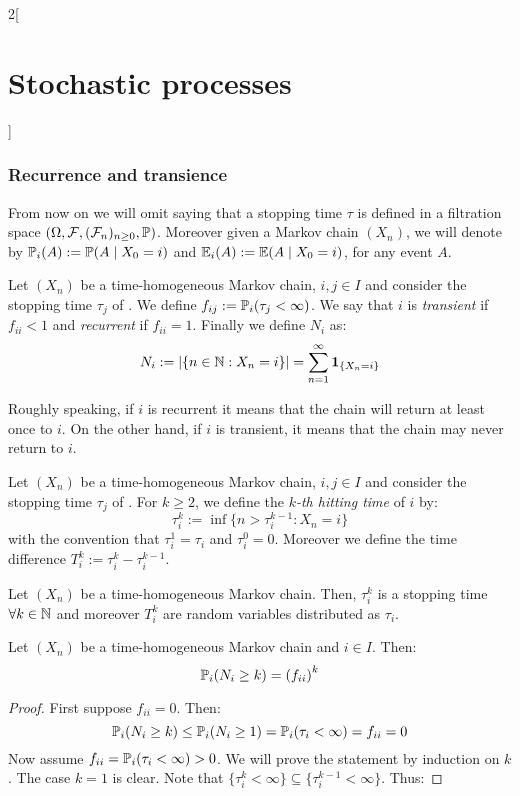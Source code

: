 \documentclass[../../../main_math.tex]{subfiles}
\begin{document}
\begin{multicols}{2}[\section{Stochastic processes}]
  \subsubsection{Recurrence and transience}
  From now on we will omit saying that a stopping time $\tau$ is defined in a filtration space $(\Omega,\mathcal{F},(\mathcal{F}_n)_{n\geq 0},\mathbb{P})$. Moreover given a Markov chain $(X_n)$, we will denote by $\mathbb{P}_i(A):=\mathbb{P}(A\mid X_0=i)$ and $\mathbb{E}_i(A):=\mathbb{E}(A\mid X_0=i)$, for any event $A$.
  \begin{definition}
    Let $(X_n)$ be a time-homogeneous Markov chain, $i,j\in I$ and consider the stopping time $\tau_j$ of . We define $f_{ij}:=\mathbb{P}_i(\tau_j<\infty)$. We say that $i$ is \emph{transient} if $f_{ii}<1$ and \emph{recurrent} if $f_{ii}=1$. Finally we define $N_i$ as:
    $$
      N_i:=\abs{\{n\in\mathbb{N}:X_n=i\}}=\sum_{n=1}^{\infty}\boldsymbol{\mathrm{1}}_{\{X_n=i\}}
    $$
  \end{definition}
  \begin{remark}
    Roughly speaking, if $i$ is recurrent it means that the chain will return at least once to $i$. On the other hand, if $i$ is transient, it means that the chain may never return to $i$.
  \end{remark}
  \begin{definition}
    Let $(X_n)$ be a time-homogeneous Markov chain, $i,j\in I$ and consider the stopping time $\tau_j$ of . For $k\geq 2$, we define the \emph{$k$-th hitting time} of $i$ by:
    $$
      \tau_i^k:= \inf\{n>\tau_i^{k-1}:X_n=i\}
    $$
    with the convention that $\tau_i^1=\tau_i$ and $\tau_i^0=0$. Moreover we define the time difference $T_i^k:=\tau_i^k-\tau_i^{k-1}$.
  \end{definition}
  \begin{lemma}
    Let $(X_n)$ be a time-homogeneous Markov chain. Then, $\tau_i^k$ is a stopping time $\forall k\in\mathbb{N}$ and moreover $T_i^k$ are \iid random variables distributed as $\tau_i$.
  \end{lemma}
  \begin{proposition}\label{SP:recurrence}
    Let $(X_n)$ be a time-homogeneous Markov chain and $i\in I$. Then:
    $$
      \mathbb{P}_i(N_i\geq k)={(f_{ii})}^k
    $$
  \end{proposition}
  \begin{proof}
    First suppose $f_{ii}=0$. Then:
    $$
      \mathbb{P}_i(N_i\geq k)\leq\mathbb{P}_i(N_i\geq 1)=\mathbb{P}_i(\tau_i<\infty)=f_{ii}=0
    $$
    Now assume $f_{ii}=\mathbb{P}_i(\tau_i<\infty)>0$. We will prove the statement by induction on $k$. The case $k=1$ is clear. Note that $\{\tau_i^k<\infty\}\subseteq \{\tau_i^{k-1}<\infty\}$. Thus:

\end{proof}
\end{multicols}
\end{document}
